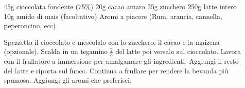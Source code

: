 \begin{ingreds}
	45g cioccolata fondente (75\%) 
	20g cacao amaro 
	25g zucchero
	250g latte intero 
	10g amido di mais (facoltativo) 
	Aromi a piacere (Rum, arancia, cannella, peperoncino, ecc)

\end{ingreds}

\begin{method}
Spezzetta il cioccolato e mescolalo con lo zucchero, il cacao e la maizena (opzionale). Scalda in un tegamino $\frac{2}{3}$ del latte poi versalo sul cioccolato. Lavora con il frullatore a immersione per amalgamare gli ingredienti. Aggiungi il resto del latte e riporta sul fuoco. Continua a frullare per rendere la bevanda più spumosa. Aggiungi gli aromi che preferisci.
\end{method}



